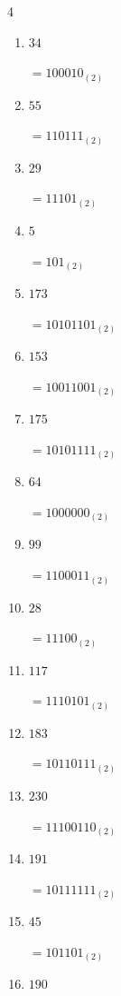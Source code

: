 \begin{multicols}{4}
\begin{enumerate}
        $=11110111_{(2)}$

  \item $34$

        $=100010_{(2)}$

  \item $55$

        $=110111_{(2)}$

  \item $29$

        $=11101_{(2)}$

  \item $5$

        $=101_{(2)}$

  \item $173$

        $=10101101_{(2)}$

\columnbreak %

\resetques

  \item $153$

        $=10011001_{(2)}$

  \item $175$

        $=10101111_{(2)}$

  \item $64$

        $=1000000_{(2)}$

  \item $99$

        $=1100011_{(2)}$

  \item $28$

        $=11100_{(2)}$

  \item $117$

        $=1110101_{(2)}$

  \item $183$

        $=10110111_{(2)}$

  \item $230$

        $=11100110_{(2)}$

  \item $191$

        $=10111111_{(2)}$

  \item $45$

        $=101101_{(2)}$

  \item $190$


\end{enumerate}
\end{multicols}

